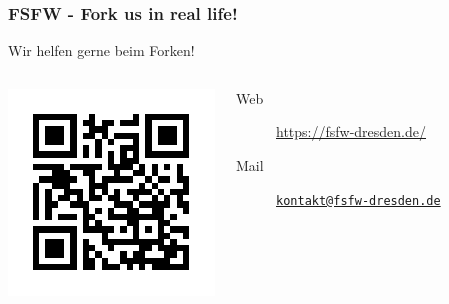 \documentclass{beamer}
\begin{document}
\begin{frame}
  \frametitle{FSFW - Fork us in real life!}
  \begin{center}
    \Large Wir helfen gerne beim Forken!
  \end{center}
  \begin{columns}
    \includegraphics[width=\textwidth]{qr-website.pdf}
    \begin{description}
      \item[Web] \url{https://fsfw-dresden.de/}
      \item[Mail] \href{mailto:kontakt@fsfw-dresden.de}{\texttt{kontakt@fsfw-dresden.de}}
    \end{description}
  \end{columns}
\end{frame}
\end{document}
